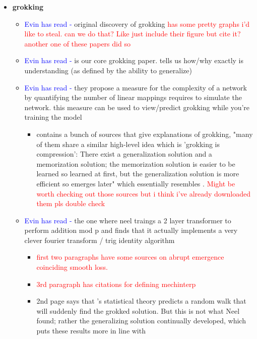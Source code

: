\documentclass{article}
\begin{document}
\begin{itemize}
    \item \textbf{grokking}
    \begin{itemize}
        \item \textcolor{blue}{Evin has read -} \cite{power2022grokking} original discovery of grokking \textcolor{red}{has some pretty graphs i'd like to steal. can we do that? Like just include their figure but cite it? another one of these papers did so}
        \item \textcolor{blue}{Evin has read -} \cite{varma2023explaining} is our core grokking paper. tells us how/why exactly is understanding (as defined by the ability to generalize)
        \item \textcolor{blue}{Evin has read -} \cite{liu2023grokking} they propose a measure for the complexity of a network by quantifying the number of linear mappings requires to simulate the network. this measure can be used to view/predict grokking while you're training the model
        \begin{itemize}
            \item contains a bunch of sources that give explanations of grokking, "many of them share a similar high-level idea which is 'grokking is compression': There exist a generalization solution and a memorization solution; the memorization solution is easier to be learned so learned at first, but the generalization solution is more efficient so emerges later" which essentially resembles \cite{varma2023explaining}. \textcolor{red}{Might be worth checking out those sources but i think i've already downloaded them pls double check}
        \end{itemize}
        \item \textcolor{blue}{Evin has read -} \cite{nanda2023progress} the one where neel traings a 2 layer transformer to perform addition mod p and finds that it actually implements a very clever fourier transform / trig identity algorithm
        \begin{itemize}
            \item \textcolor{red}{first two paragraphs have some sources on abrupt emergence coinciding smooth loss.}
            \item \textcolor{red}{3rd paragraph has citations for defining mechinterp}
            \item 2nd page says that \cite{millidge2022gg}’s statistical theory predicts a random walk that will suddenly find the grokked solution. But this is not what Neel found; rather the generalizing solution continually developed, which puts these results more in line with \cite{varma2023explaining}

\end{itemize}
\end{itemize}
\end{itemize}
\end{document}
